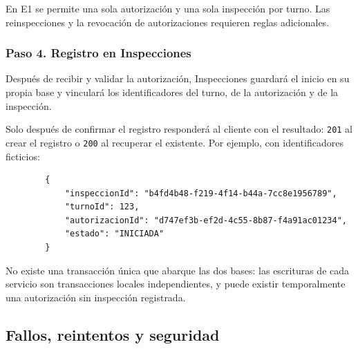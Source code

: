 \documentclass[11pt,a4paper]{article}
\begin{document}
	En E1 se permite una sola autorización y una sola inspección por turno. Las reinspecciones y la revocación de autorizaciones requieren reglas adicionales.
	
	\subsubsection{Paso 4. Registro en Inspecciones}
	
	Después de recibir y validar la autorización, Inspecciones guardará el inicio en su propia base y vinculará los identificadores del turno, de la autorización y de la inspección.
	
	Solo después de confirmar el registro responderá al cliente con el resultado: \texttt{201} al crear el registro o \texttt{200} al recuperar el existente. Por ejemplo, con identificadores ficticios:
	
	\begin{lstlisting}
		{
			"inspeccionId": "b4fd4b48-f219-4f14-b44a-7cc8e1956789",
			"turnoId": 123,
			"autorizacionId": "d747ef3b-ef2d-4c55-8b87-f4a91ac01234",
			"estado": "INICIADA"
		}
	\end{lstlisting}
	
	No existe una transacción única que abarque las dos bases: las escrituras de cada servicio son transacciones locales independientes, y puede existir temporalmente una autorización sin inspección registrada.
	
	\subsection{Fallos, reintentos y seguridad}
	
\end{document}
